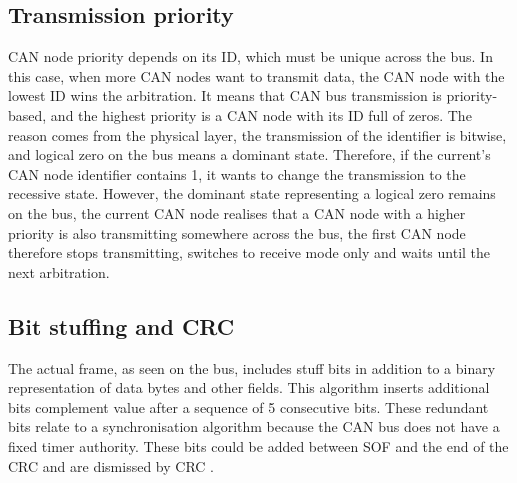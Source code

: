 \documentclass{ctuthesis}
\begin{document}
  \subsection{Transmission priority}
   CAN node priority depends on its ID, which must be unique across the bus. In this case, when more CAN nodes want to transmit data, the CAN node with the lowest ID wins the arbitration. It means that CAN bus transmission is priority-based, and the highest priority is a CAN node with its ID full of zeros. The reason comes from the physical layer, the transmission of the identifier is bitwise, and logical zero on the bus means a dominant state. Therefore, if the current's CAN node identifier contains 1, it wants to change the transmission to the recessive state. However, the dominant state representing a logical zero remains on the bus, the current CAN node realises that a CAN node with a higher priority is also transmitting somewhere across the bus, the first CAN node therefore stops transmitting, switches to receive mode only and waits until the next arbitration.
  \subsection{Bit stuffing and CRC}
   The actual frame, as seen on the bus, includes stuff bits in addition to a binary representation of data bytes and other fields. This algorithm inserts additional bits complement value after a sequence of 5 consecutive bits. These redundant bits relate to a synchronisation algorithm because the CAN bus does not have a fixed timer authority. These bits could be added between SOF and the end of the CRC and are dismissed by CRC \cite{can_crc}.
\end{document}
